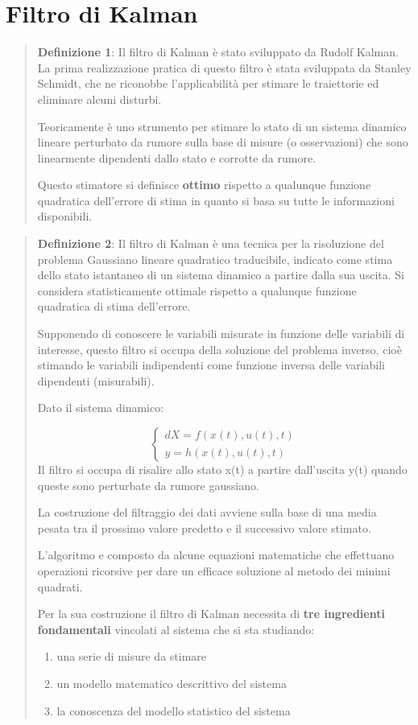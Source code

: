 \section{Filtro di Kalman}
\begin{quotation}
	\textbf{Definizione 1}: Il filtro di Kalman è stato sviluppato da Rudolf Kalman. 
	La prima realizzazione pratica di questo filtro è stata sviluppata da Stanley Schmidt, che ne riconobbe l'applicabilità per stimare le traiettorie ed eliminare alcuni disturbi.
	
	Teoricamente è uno strumento per stimare lo stato di un sistema dinamico lineare perturbato da rumore sulla base di misure (o osservazioni) che sono linearmente dipendenti dallo stato e corrotte da rumore.
	
	Questo stimatore si definisce \textbf{ottimo} rispetto a qualunque funzione quadratica dell’errore di stima in quanto si basa su tutte le informazioni disponibili.
\end{quotation}
\begin{quotation}
	\textbf{Definizione 2}:	Il filtro di Kalman è una tecnica per la risoluzione del problema Gaussiano lineare quadratico traducibile, indicato come stima dello stato istantaneo di un sistema dinamico a partire dalla sua uscita. Si considera statisticamente ottimale rispetto a qualunque funzione quadratica di stima dell'errore.
	
	Supponendo di conoscere le variabili misurate in funzione delle variabili di interesse, questo filtro si occupa della soluzione del problema inverso, cioè stimando le variabili indipendenti come funzione inversa delle variabili dipendenti (misurabili).
	
	Dato il sistema dinamico:
	
	\begin{equation}
	\begin{cases}
		dX = f ( x(t),u(t),t) \\
		y = h( x(t),u(t),t)
	\end{cases}
	\end{equation}
	Il filtro si occupa di risalire allo stato x(t) a partire dall'uscita y(t) quando queste sono perturbate da rumore gaussiano.
	
	La costruzione del filtraggio dei dati avviene sulla base di una media pesata tra il prossimo valore predetto e il successivo valore stimato.
	
	L'algoritmo e composto da alcune equazioni matematiche che effettuano operazioni ricorsive per dare un efficace soluzione al metodo dei minimi quadrati.
	
	Per la sua costruzione il filtro di Kalman necessita di \textbf{tre ingredienti	fondamentali} vincolati al sistema che si sta studiando:
	\begin{enumerate}
		\item una serie di misure da stimare
		\item un modello matematico descrittivo del sistema
		\item la conoscenza del	modello statistico del sistema
	\end{enumerate}
	
\end{quotation}	

 
 
